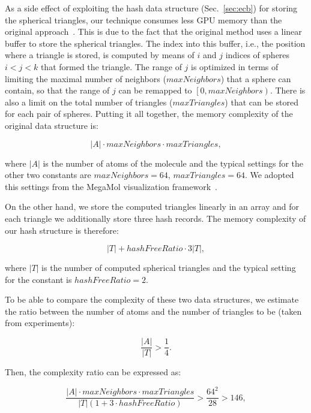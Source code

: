 As a side effect of exploiting the hash data structure (Sec.~\ref{sec:ecb}) for storing the spherical triangles, our technique consumes less GPU memory than the original approach~\cite{krone2011parallel}.
This is due to the fact that the original method uses a linear buffer to store the spherical triangles.
The index into this buffer, i.e., the position where a triangle is stored, is computed by means of $i$ and $j$ indices of spheres $i < j < k$ that formed the triangle.
The range of $j$ is optimized in terms of limiting the maximal number of neighbors ($maxNeighbors$) that a sphere can contain, so that the range of $j$ can be remapped to $\left[0, maxNeighbors\right)$.
There is also a limit on the total number of triangles ($maxTriangles$) that can be stored for each pair of spheres.
Putting it all together, the memory complexity of the original data structure is:

\begin{equation}
|A| \cdot maxNeighbors \cdot maxTriangles,
\end{equation}

where $|A|$ is the number of atoms of the molecule and the typical settings for the other two constants are $maxNeighbors = 64$, $maxTriangles = 64$.
We adopted this settings from the MegaMol visualization framework~\cite{grottel2015megamol}.

On the other hand, we store the computed triangles linearly in an array and for each triangle we additionally store three hash records. 
The memory complexity of our hash structure is therefore:

\begin{equation}
|T| + hashFreeRatio \cdot 3 |T|,
\end{equation}

where $|T|$ is the number of computed spherical triangles and the typical setting for the constant is $hashFreeRatio = 2$. 

To be able to compare the complexity of these two data structures, we estimate the ratio between the number of atoms and the number of triangles to be (taken from experiments):

\begin{equation}
\frac{|A|}{|T|} > \frac{1}{4}.
\end{equation}

Then, the complexity ratio can be expressed as:

\begin{equation}
\frac{|A| \cdot maxNeighbors \cdot maxTriangles}{|T|(1 + 3 \cdot hashFreeRatio)} > \frac{64^2}{28} > 146,
\end{equation}


